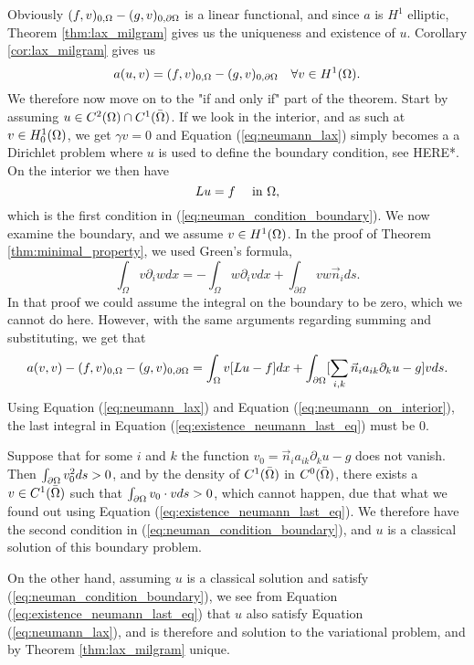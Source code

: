 \begin{bev}
   Obviously $ (f,v)_{0,\Omega} - (g,v)_{0,\partial\Omega}$ is a linear functional, 
   and since $a$ is $H^1$ elliptic, Theorem \ref{thm:lax_milgram} gives us the 
   uniqueness and existence of $u$.
   Corollary \ref{cor:lax_milgram} gives us
   \begin{equation}
      a(u,v) = (f,v)_{0,\Omega} - (g,v)_{0,\partial\Omega} \quad \forall v \in H^1(\Omega). \label{eq:neumann_lax}
   \end{equation}
   We therefore now move on to the "if and only if" part of the theorem. Start by 
   assuming $u \in C^2(\Omega)\cap C^1(\bar{\Omega})$.
   If we look in the interior, and as such at $v \in H^1_0(\Omega)$, we get $\gamma v=0$ 
   and Equation (\ref{eq:neumann_lax}) simply becomes a a Dirichlet problem where 
   $u$ is used to define the boundary condition, see HERE*. %
   On the interior we then have 
   \begin{equation}
    Lu = f \quad \text{ in }\Omega, \label{eq:neumann_on_interior}
   \end{equation} 
   which is the first condition in (\ref{eq:neuman_condition_boundary}).
   We now examine the boundary, and we assume $v\in H^1(\Omega)$.
   In the proof of Theorem \ref{thm:minimal_property}, we used Green's formula,
    \begin{equation} %
        \int_\Omega v\partial_i w dx = -\int_\Omega w \partial_i v dx + \int_{\partial \Omega} v w \vec{n}_i ds.
    \end{equation}
   In that proof we could assume the integral on the boundary to be zero, which 
   we cannot do here. However, with the same arguments regarding summing and substituting, 
   we get that 
   \begin{equation}
      a(v,v) - (f,v)_{0,\Omega} - (g,v)_{0,\partial\Omega} = 
      \int_\Omega v[Lu - f] dx + \int_{\partial \Omega}
     [ \sum_{i,k}  \vec{n}_i a_{ik} \partial_k u-g]v ds.
     \label{eq:existence_neumann_last_eq}
   \end{equation}
   Using Equation (\ref{eq:neumann_lax}) and Equation (\ref{eq:neumann_on_interior}),
   the last integral in Equation (\ref{eq:existence_neumann_last_eq}) must be $0$.

   Suppose that for some $i$ and $k$ the function $v_0 = \vec{n}_i a_{ik} \partial_k u -g$ does 
   not vanish. Then $\int_{\partial\Omega}v_0^2ds>0$, and by the density of 
   $C^1(\bar{\Omega})$ in $C^0(\bar{\Omega})$, there exists a $v\in C^1(\bar{\Omega})$
   such that  $\int_{\partial\Omega}v_0\cdot vds>0$, which cannot happen, due that 
   what we found out using Equation (\ref{eq:existence_neumann_last_eq}). 
   We therefore have the second condition in (\ref{eq:neuman_condition_boundary}),
   and $u$ is a classical solution of this boundary problem.

   On the other hand, assuming $u$ is a classical solution and satisfy (\ref{eq:neuman_condition_boundary}),
   we see from Equation (\ref{eq:existence_neumann_last_eq}) that $u$ also satisfy 
   Equation (\ref{eq:neumann_lax}), and is therefore and solution to the variational 
   problem, and by Theorem \ref{thm:lax_milgram} unique.
\end{bev}